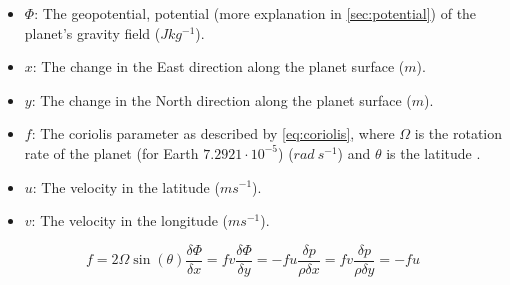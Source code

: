 \begin{itemize}
    \item $\Phi$: The geopotential, potential (more explanation in \autoref{sec:potential}) of the planet's gravity field ($Jkg^{-1}$).
    \item $x$: The change in the East direction along the planet surface ($m$).
    \item $y$: The change in the North direction along the planet surface ($m$).
    \item $f$: The coriolis parameter as described by \autoref{eq:coriolis}, where $\Omega$ is the rotation rate of the planet (for Earth $7.2921 \cdot 10^{-5}$) ($rad \ s^{-1}$) and $\theta$ is the 
    latitude \cite{coriolis}.
    \item $u$: The velocity in the latitude ($ms^{-1}$).
    \item $v$: The velocity in the longitude ($ms^{-1}$).
\end{itemize}

\begin{subequations}
    \begin{equation}
        f = 2\Omega\sin(\theta)
        \label{eq:coriolis}
    \end{equation}
    \begin{equation}
        \frac{\delta \Phi}{\delta x} = fv
        \label{eq:pu simple}
    \end{equation}
    \begin{equation}
        \frac{\delta \Phi}{\delta y} = -fu
        \label{eq:pv simple}
    \end{equation}
    \begin{equation}
        \frac{\delta p}{\rho \delta x} = fv
        \label{eq:pu simple final}
    \end{equation}
    \begin{equation}
        \frac{\delta p}{\rho \delta y} = -fu
        \label{eq:pv simple final}
    \end{equation}
\end{subequations}

